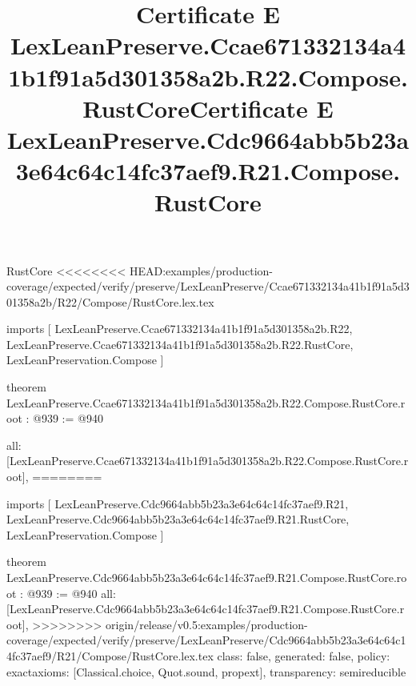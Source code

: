 \begin{lexlean}{RustCore}
<<<<<<<< HEAD:examples/production-coverage/expected/verify/preserve/LexLeanPreserve/Ccae671332134a41b1f91a5d301358a2b/R22/Compose/RustCore.lex.tex
\title{Certificate E LexLeanPreserve.Ccae671332134a41b1f91a5d301358a2b.R22.Compose.RustCore}
\begin{coremodule}
imports [
  LexLeanPreserve.Ccae671332134a41b1f91a5d301358a2b.R22,
  LexLeanPreserve.Ccae671332134a41b1f91a5d301358a2b.R22.RustCore,
  LexLeanPreservation.Compose
]

theorem LexLeanPreserve.Ccae671332134a41b1f91a5d301358a2b.R22.Compose.RustCore.root : @939 := @940 {
  all: [LexLeanPreserve.Ccae671332134a41b1f91a5d301358a2b.R22.Compose.RustCore.root],
========
\title{Certificate E LexLeanPreserve.Cdc9664abb5b23a3e64c64c14fc37aef9.R21.Compose.RustCore}
\begin{coremodule}
imports [
  LexLeanPreserve.Cdc9664abb5b23a3e64c64c14fc37aef9.R21,
  LexLeanPreserve.Cdc9664abb5b23a3e64c64c14fc37aef9.R21.RustCore,
  LexLeanPreservation.Compose
]

theorem LexLeanPreserve.Cdc9664abb5b23a3e64c64c14fc37aef9.R21.Compose.RustCore.root : @939 := @940 {
  all: [LexLeanPreserve.Cdc9664abb5b23a3e64c64c14fc37aef9.R21.Compose.RustCore.root],
>>>>>>>> origin/release/v0.5:examples/production-coverage/expected/verify/preserve/LexLeanPreserve/Cdc9664abb5b23a3e64c64c14fc37aef9/R21/Compose/RustCore.lex.tex
  class: false,
  generated: false,
  policy: exact{axioms: [Classical.choice, Quot.sound, propext]},
  transparency: semireducible
}


\end{coremodule}}
\end{coremodule}
\end{lexlean}
